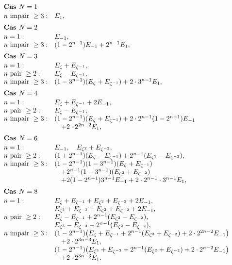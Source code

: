\documentclass[10pt,a4paper]{article}
\theoremstyle{deligne}
\begin{document}
\[
\begin{array}{ll}
\multicolumn{2}{l}{\textbf{Cas }N=1}\\[0.15em]
n\hbox{ impair }\ge3: & E_1,\\[0.5em]
\multicolumn{2}{l}{\textbf{Cas }N=2}\\[0.15em]
n=1: & E_{-1},\\
n\hbox{ impair }\ge3: & (1-2^{n-1})E_{-1}+2^{n-1}E_1,\\[0.5em]
\multicolumn{2}{l}{\textbf{Cas }N=3}\\[0.15em]
n=1: & E_\zeta+E_{\zeta^{-1}},\\
n\hbox{ pair }\ge2: & E_\zeta-E_{\zeta^{-1}},\\
n\hbox{ impair }\ge3: & (1-3^{n-1})(E_\zeta+E_{\zeta^{-1}})+2\cdot3^{n-1}E_1,\\[0.5em]
\multicolumn{2}{l}{\textbf{Cas }N=4}\\[0.15em]
n=1: & E_\zeta+E_{\zeta^{-1}}+2E_{-1},\\
n\hbox{ pair }\ge2: & E_\zeta-E_{\zeta^{-1}},\\
n\hbox{ impair }\ge3: & (1-2^{n-1})(E_\zeta+E_{\zeta^{-1}})+2\cdot2^{n-1}(1-2^{n-1})E_{-1}\\
&\quad +2\cdot2^{2n-2}E_1,\\[0.5em]
\multicolumn{2}{l}{\textbf{Cas }N=6}\\[0.15em]
n=1: & E_{-1},\quad E_{\zeta^2}+E_{\zeta^{-2}},\\
n\hbox{ pair }\ge2: & (1+2^{n-1})(E_\zeta-E_{\zeta^{-1}})+2^{n-1}(E_{\zeta^2}-E_{\zeta^{-2}}),\\
n\hbox{ impair }\ge3: & (1-2^{n-1})(1-3^{n-1})(E_\zeta+E_{\zeta^{-1}})\\
&\quad +2^{n-1}(1-3^{n-1})(E_{\zeta^2}+E_{\zeta^{-2}})\\
&\quad +2(1-2^{n-1})3^{n-1}E_{-1}+2\cdot2^{n-1}\cdot3^{n-1}E_1,\\[0.5em]
\multicolumn{2}{l}{\textbf{Cas }N=8}\\[0.15em]
n=1: & E_\zeta+E_{\zeta^{-1}}+E_{\zeta^2}+E_{\zeta^{-2}}+2E_{-1},\\
& E_{\zeta^3}+E_{\zeta^{-3}}+E_{\zeta^2}+E_{\zeta^{-2}}+2E_{-1},\\
n\hbox{ pair }\ge2: & E_\zeta-E_{\zeta^{-1}}+2^{n-1}(E_{\zeta^2}-E_{\zeta^{-2}}),\\
& E_{\zeta^3}-E_{\zeta^{-3}}-2^{n-1}(E_{\zeta^2}-E_{\zeta^{-2}}),\\
n\hbox{ impair }\ge3: & (1-2^{n-1})\bigl(E_\zeta+E_{\zeta^{-1}}+2^{n-1}(E_{\zeta^2}+E_{\zeta^{-2}})+2\cdot2^{2n-2}E_{-1}\bigr)\\
&\quad +2\cdot2^{3n-3}E_1,\\
& (1-2^{n-1})\bigl(E_{\zeta^3}+E_{\zeta^{-3}}+2^{n-1}(E_{\zeta^2}+E_{\zeta^{-2}})+2\cdot2^{n-2}E_{-1}\bigr)\\
&\quad +2\cdot2^{3n-3}E_1.
\end{array}
\]
\end{document}
